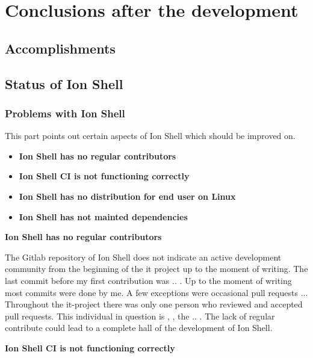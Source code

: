 \chapter{Conclusions after the development}

\newcommand{\itemIonShellRegularContributor}{\textbf{Ion Shell has no regular contributors}}
\newcommand{\itemIonShellCI}{\textbf{}
	\textbf{Ion Shell has not mainted dependencies}
}
\newcommand{\itemIonShellDistribution}{
	\textbf{Ion Shell has no distribution for end user on Linux}
}
\newcommand{\itemIonShellDependencies}{\textbf{Ion Shell CI is not functioning correctly}}

\section{Accomplishments}

\section{Status of Ion Shell}

\subsection{Problems with Ion Shell}

This part points out certain aspects of Ion Shell which should be improved on.

\begin{itemize}
	\item \itemIonShellRegularContributor
	\item \itemIonShellDependencies
	\item \itemIonShellDistribution
	\item \itemIonShellCI
\end{itemize}

\itemIonShellRegularContributor

The Gitlab repository of Ion Shell does not indicate an active development community
from the beginning of the it project up to the moment of writing.
The last commit before my first contribution was .. .
Up to the moment of writing most commits were done by me.
A few exceptions were occasional pull requests ...
Throughout the it-project there was only one person who reviewed and accepted pull requests.
This individual in question is , , the .. .
The lack of regular contribute could lead to a complete hall of the development of Ion Shell.

\itemIonShellDependencies

